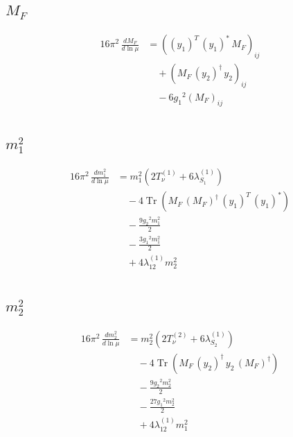\documentclass[10pt,a4paper]{article}
\begin{document}
\subsection*{$M_F$}
\begin{align*}
16\pi^2\,\frac{d M_F}{d\ln\mu} &=\left(\left({y_1}\right)^{T}\,\left({y_1}\right)^{*}\,{M_F}\right)_{ij} \\
&\quad +\left({M_F}\,\left({y_2}\right)^{\dagger}\,{y_2}\right)_{ij} \\
&\quad -6 {g_1}^2 \left({M_F}\right)_{ij} \\
\end{align*}
\subsection*{$m_1^2$}
\begin{align*}
16\pi^2\,\frac{d m_1^2}{d\ln\mu} &={m_1^2} (2 T_{\nu}^{(1)}+6 {\lambda_{S_1}^{(1)}}) \\
&\quad -4 \operatorname{Tr}\!\left({M_F}\,\left({M_F}\right)^{\dagger}\,\left({y_1}\right)^{T}\,\left({y_1}\right)^{*}\right) \\
&\quad -\frac{9 {g_2}^2 {m_1^2}}{2} \\
&\quad -\frac{3 {g_1}^2 {m_1^2}}{2} \\
&\quad +4 {\lambda_{12}^{(1)}} {m_2^2} \\
\end{align*}
\subsection*{$m_2^2$}
\begin{align*}
16\pi^2\,\frac{d m_2^2}{d\ln\mu} &={m_2^2} (2 T_{\nu}^{(2)}+6 {\lambda_{S_2}^{(1)}}) \\
&\quad -4 \operatorname{Tr}\!\left({M_F}\,\left({y_2}\right)^{\dagger}\,{y_2}\,\left({M_F}\right)^{\dagger}\right) \\
&\quad -\frac{9 {g_2}^2 {m_2^2}}{2} \\
&\quad -\frac{27 {g_1}^2 {m_2^2}}{2} \\
&\quad +4 {\lambda_{12}^{(1)}} {m_1^2} \\
\end{align*}
\end{document}

